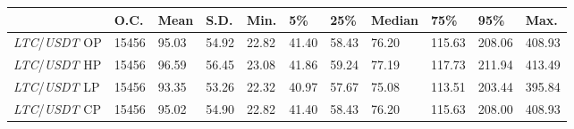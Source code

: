 \begin{tabular}{lllllllllll}
\toprule
 & \textbf{O.C.} & \textbf{Mean} & \textbf{S.D.} & \textbf{Min.} & \textbf{5\%} & \textbf{25\%} & \textbf{Median} & \textbf{75\%} & \textbf{95\%} & \textbf{Max.} \\
\midrule
\emph{LTC}/\emph{USDT} OP & 15456 & 95.03 & 54.92 & 22.82 & 41.40 & 58.43 & 76.20 & 115.63 & 208.06 & 408.93 \\
\emph{LTC}/\emph{USDT} HP & 15456 & 96.59 & 56.45 & 23.08 & 41.86 & 59.24 & 77.19 & 117.73 & 211.94 & 413.49 \\
\emph{LTC}/\emph{USDT} LP & 15456 & 93.35 & 53.26 & 22.32 & 40.97 & 57.67 & 75.08 & 113.51 & 203.44 & 395.84 \\
\emph{LTC}/\emph{USDT} CP & 15456 & 95.02 & 54.90 & 22.82 & 41.40 & 58.43 & 76.20 & 115.63 & 208.00 & 408.93 \\
\bottomrule
\end{tabular}
